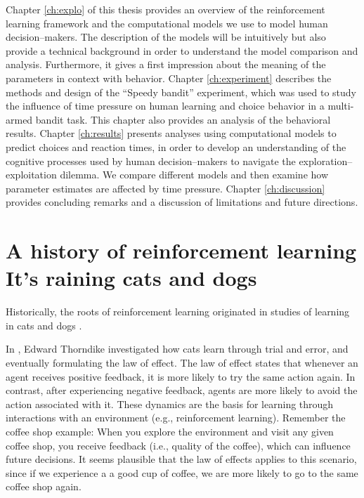 Chapter \ref{ch:explo} of this thesis provides an overview of the reinforcement learning framework and the computational models we use to model human decision--makers. The description of the models will be intuitively but also provide a technical background in order to understand the model comparison and analysis. Furthermore, it gives a first impression about the meaning of the parameters in context with behavior. 
Chapter \ref{ch:experiment} describes the methods and design of the ``Speedy bandit'' experiment, which was used to study the influence of time pressure on human learning and choice behavior in a multi-armed bandit task. This chapter also provides an analysis of the behavioral results.
Chapter \ref{ch:results} presents analyses using computational models to predict choices and reaction times, in order to develop an understanding of the cognitive processes used by human decision--makers to navigate the exploration--exploitation dilemma. %
We compare different models and then examine how parameter estimates are affected by time pressure. %
Chapter \ref{ch:discussion} provides concluding remarks and a discussion of limitations and future directions. 


 
\section[A history of reinforcement learning. It's raining cats and dogs]{A history of reinforcement learning\\ {\large It's raining cats and dogs}} 
Historically, the roots of reinforcement learning originated in studies of learning in cats \citep{thorndike1927law} and dogs \citep{pavlov1927conditional}.

In \citeyear{thorndike1927law}, Edward Thorndike investigated how cats learn through trial and error, and eventually formulating the law of effect.
The law of effect states that whenever an agent receives positive feedback, it is more likely to try the same action again. In contrast, after experiencing negative feedback, agents are more likely to avoid the action associated with it.
These dynamics are the basis for learning through interactions with an environment (e.g., reinforcement learning). Remember the coffee shop example: When you explore the environment and visit any given coffee shop, you receive feedback (i.e., quality of the coffee), which can influence future decisions. It seems plausible that the law of effects applies to this scenario, since if we experience a a good cup of coffee, we are more likely to go to the same coffee shop again. 

